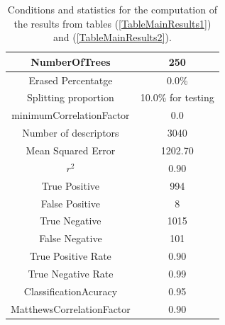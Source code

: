 \documentclass[11pt]{article}
\begin{document}
\begin{table}[H]
    \centering	
	\caption{Conditions and statistics for the computation of the results from tables (\ref{TableMainResults1}) and (\ref{TableMainResults2}).}
	\label{TableConditionsMainResults}
	\begin{tabular}{c|c}
		NumberOfTrees            & 250\\\hline
		Erased Percentatge       & 0.0\%\\\hline
		Splitting proportion     & 10.0\% for testing \\\hline
		minimumCorrelationFactor & 0.0\\\hline
		Number of descriptors    & 3040\\\hline
		Mean Squared Error       & 1202.70\\\hline
		$r^2$ 	                 & 0.90\\\hline
		True Positive            & 994\\\hline
		False Positive           & 8\\\hline
		True Negative            & 1015\\\hline
		False Negative           & 101\\\hline
		True Positive Rate       & 0.90\\\hline
		True Negative Rate       & 0.99\\\hline
		ClassificationAcuracy    & 0.95\\\hline
		MatthewsCorrelationFactor& 0.90
    \end{tabular}
\end{table}
\end{document}
